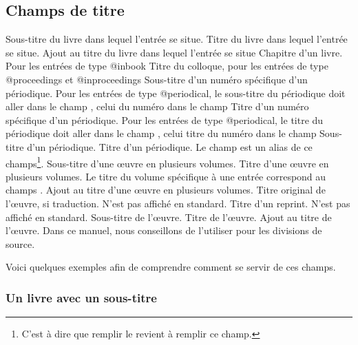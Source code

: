 \subsection{Champs de titre}


\begin{fieldlist}
	Sous-titre du livre dans lequel l'entrée se situe. 
   	 Titre du livre dans lequel l'entrée se situe. 		
   	 Ajout au titre du livre dans lequel l'entrée se situe 
   	 Chapitre d'un livre. Pour les entrées de type @inbook	
   	 Titre du colloque, pour les entrées de type @proceedings et @inproceedings 
   	 Sous-titre d'un numéro spécifique d'un périodique. 	Pour les entrées de type @periodical, le sous-titre du périodique doit aller dans le champ , celui du numéro dans le champ 		
   	 Titre d'un numéro spécifique d'un périodique. Pour les entrées de type @periodical, le titre du périodique doit aller dans le champ , celui titre du numéro dans le champ 		
   	 Sous-titre d'un périodique.							
   	 Titre d'un périodique. Le champ  est un alias de ce champs\footnote{C'est à dire que remplir le  revient à remplir ce champ.}.							
   	 Sous-titre d'une œuvre en plusieurs volumes.			
   	 Titre d'une œuvre en plusieurs volumes. Le titre du volume spécifique à une entrée correspond au champs .						
   	  Ajout au titre d'une œuvre en plusieurs volumes.		
   	 Titre original de l'œuvre, si traduction. N'est pas affiché en standard. 
   	 Titre d'un reprint. N'est pas affiché en standard.	
   	 Sous-titre de l'œuvre.									
   	 Titre de l'œuvre.									
   	 Ajout au titre de l'œuvre. Dans ce manuel, nous conseillons de l'utiliser pour les divisions de source. 
\end{fieldlist}

Voici quelques exemples afin de comprendre comment se servir de ces champs.

\subsubsection{Un livre avec un sous-titre}

